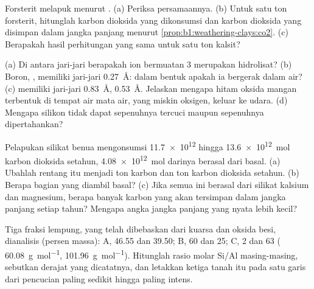 \begin{exercise}[$\star\star$]\label{exo:b1:weathering-clays:9}
Forsterit  melapuk menurut
. (a) Periksa persamaannya. (b) Untuk satu ton forsterit, hitunglah karbon dioksida yang dikonsumsi dan karbon dioksida yang disimpan dalam jangka panjang menurut \cref{prop:b1:weathering-clays:co2}. (c) Berapakah hasil perhitungan yang sama untuk satu ton kalsit?
\end{exercise}

\begin{exercise}[$\star\star\star$]\label{exo:b1:weathering-clays:10}
(a) Di antara jari-jari berapakah ion bermuatan 3 merupakan hidrolisat? (b) Boron,
, memiliki jari-jari \qty{0.27}{\angstrom}: dalam bentuk apakah ia bergerak dalam air? (c)  memiliki jari-jari \qty{0.83}{\angstrom},  \qty{0.53}{\angstrom}. Jelaskan mengapa  hitam oksida mangan terbentuk di tempat air mata air, yang miskin oksigen, keluar ke udara. (d) Mengapa silikon tidak dapat sepenuhnya tercuci maupun sepenuhnya dipertahankan?
\end{exercise}

\begin{exercise}[$\star\star\star$]\label{exo:b1:weathering-clays:11}
Pelapukan silikat benua mengonsumsi \num{11.7e12} hingga \qty{13.6e12}{mol} karbon dioksida setahun, \qty{4.08e12}{mol} darinya berasal dari basal. (a) Ubahlah rentang itu menjadi ton karbon dan ton karbon dioksida setahun. (b) Berapa bagian yang diambil basal? (c) Jika semua ini berasal dari silikat kalsium dan magnesium, berapa banyak karbon yang akan tersimpan dalam jangka panjang setiap tahun? Mengapa angka jangka panjang yang nyata lebih kecil?
\end{exercise}

\begin{exercise}[$\star\star\star$]\label{exo:b1:weathering-clays:12}
Tiga fraksi lempung, yang telah dibebaskan dari kuarsa dan oksida besi, dianalisis (persen
massa): A,  \num{46.55} dan  \num{39.50}; B,  60 dan
 25; C,  2 dan  63 (
\qty{60.08}{g.mol^{-1}},  \qty{101.96}{g.mol^{-1}}). Hitunglah rasio molar Si/Al masing-masing, sebutkan derajat  yang dicatatnya, dan letakkan ketiga tanah itu pada satu garis dari pencucian paling sedikit hingga paling intens.
\end{exercise}

